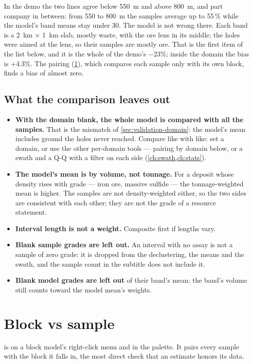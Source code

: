 In the demo the two lines agree below 550~m and above 800~m, and part company in between: from 550 to 800~m the samples average up to 55\,\% while the model's band means stay under 30. The model is not wrong there. Each band is a 2~km × 1~km slab, mostly waste, with the ore lens in its middle; the holes were aimed at the lens, so their samples are mostly ore. That is the first item of the list below, and it is the whole of the demo's −23\%; inside the domain  the bias is +4.3\%. The pairing (\cref{sec:validation-pairing}), which compares each sample only with its own block, finds a bias of almost zero.

\subsection{What the comparison leaves out}
\begin{itemize}
\item \textbf{With the domain blank, the whole model is compared with all the samples.} That is the mismatch of \cref{sec:validation-domain}: the model's mean includes ground the holes never reached. Compare like with like: set a domain, or use the other per-domain tools — pairing by domain below, or a swath and a Q-Q with a filter on each side (\cref{ch:swath,ch:stats}).
\item \textbf{The model's mean is by volume, not tonnage.} For a deposit whose density rises with grade — iron ore, massive sulfide — the tonnage-weighted mean is higher. The samples are not density-weighted either, so the two sides are consistent with each other; they are not the grade of a resource statement.
\item \textbf{Interval length is not a weight.} Composite first if lengths vary.
\item \textbf{Blank sample grades are left out.} An interval with no assay is not a sample of zero grade: it is dropped from the declustering, the means and the swath, and the sample count in the subtitle does not include it.
\item \textbf{Blank model grades are left out} of their band's mean; the band's volume still counts toward the model mean's weights.
\end{itemize}

\section{Block vs sample}\label{sec:validation-pairing}
 is on a block model's right-click menu and in the palette. It pairs every sample with the block it falls in, the most direct check that an estimate honors its data.

